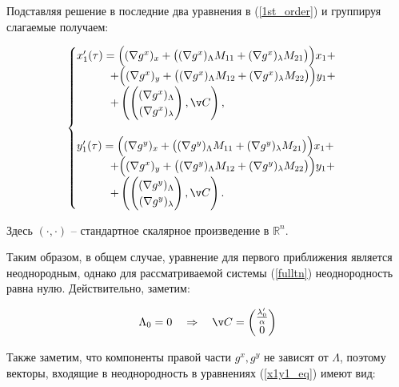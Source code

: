 \begin{enumerate}
Подставляя решение в последние два уравнения в (\ref{1st_order}) и группируя слагаемые получаем:

\begin{equation}
    \begin{cases}
        x_1'(\tau) = 
            \Big( 
                (\nabla g^x)_x + \big( (\nabla g^x)_\Lambda M_{11} + (\nabla g^x)_\lambda M_{21} \big)
            \Big)x_1 +\\
            \quad \quad \quad + \Big(
                (\nabla g^x)_y + \big( (\nabla g^x)_\Lambda M_{12} + (\nabla g^x)_\lambda M_{22} \big)
            \Big)y_1 +\\
            \quad \quad \quad + \left( \begin{pmatrix} (\nabla g^x)_\Lambda \\ (\nabla g^x)_\lambda \end{pmatrix},\v C \right), \\
            \\
        y_1'(\tau)=
            \Big(
                (\nabla g^y)_x + \big( (\nabla g^y)_\Lambda M_{11} + (\nabla g^y)_\lambda M_{21} \big)
            \Big)x_1 +\\
            \quad \quad \quad + \Big(
                (\nabla g^x)_y + \big( (\nabla g^y)_\Lambda M_{12} + (\nabla g^y)_\lambda M_{22} \big)
            \Big)y_1 +\\
            \quad \quad \quad + \left( \begin{pmatrix} (\nabla g^y)_\Lambda \\ (\nabla g^y)_\lambda \end{pmatrix},\v C \right). \\
    \end{cases}
    \label{x1y1_eq}
\end{equation}

Здесь $(\cdot,\cdot)$ -- стандартное скалярное произведение в $\mathbb{R}^n$.

Таким образом, в общем случае, уравнение для первого приближения является неоднородным, однако для рассматриваемой системы (\ref{fulltn}) неоднородность равна нулю. Действительно, заметим:

$$\Lambda_0 = 0 \quad \Rightarrow \quad \v C = \begin{pmatrix} \frac{\lambda_0'}{\alpha} \\ 0 \end{pmatrix}$$

Также заметим, что компоненты правой части $g^x, g^y$ не зависят от $\Lambda$, поэтому векторы, входящие в неоднородность в уравнениях (\ref{x1y1_eq}) имеют вид:


\end{enumerate}
